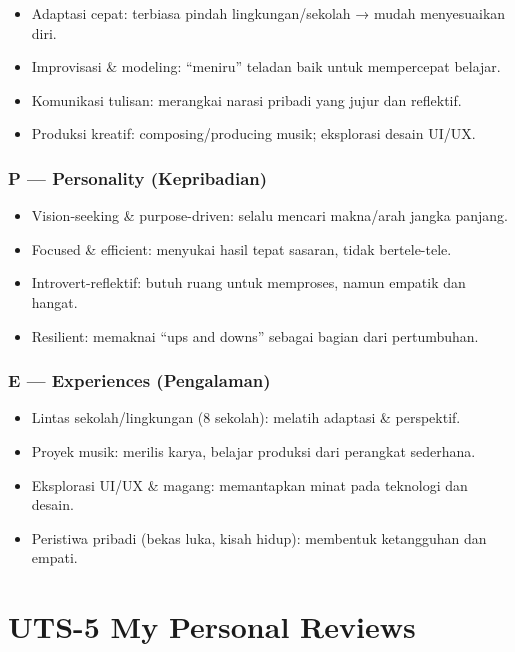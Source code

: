 \documentclass[
  letterpaper,
  DIV=11,
  numbers=noendperiod]{scrreprt}
\providecommand{\tightlist}{%
  \setlength{\itemsep}{0pt}\setlength{\parskip}{0pt}}
\begin{document}
\begin{itemize}
\tightlist
\item
  Adaptasi cepat: terbiasa pindah lingkungan/sekolah → mudah
  menyesuaikan diri.
\item
  Improvisasi \& modeling: ``meniru'' teladan baik untuk mempercepat
  belajar.
\item
  Komunikasi tulisan: merangkai narasi pribadi yang jujur dan reflektif.
\item
  Produksi kreatif: composing/producing musik; eksplorasi desain UI/UX.
\end{itemize}

\subsection{P --- Personality
(Kepribadian)}\label{p-personality-kepribadian}

\begin{itemize}
\tightlist
\item
  Vision-seeking \& purpose-driven: selalu mencari makna/arah jangka
  panjang.
\item
  Focused \& efficient: menyukai hasil tepat sasaran, tidak
  bertele-tele.
\item
  Introvert-reflektif: butuh ruang untuk memproses, namun empatik dan
  hangat.
\item
  Resilient: memaknai ``ups and downs'' sebagai bagian dari pertumbuhan.
\end{itemize}

\subsection{E --- Experiences
(Pengalaman)}\label{e-experiences-pengalaman}

\begin{itemize}
\tightlist
\item
  Lintas sekolah/lingkungan (8 sekolah): melatih adaptasi \& perspektif.
\item
  Proyek musik: merilis karya, belajar produksi dari perangkat
  sederhana.
\item
  Eksplorasi UI/UX \& magang: memantapkan minat pada teknologi dan
  desain.
\item
  Peristiwa pribadi (bekas luka, kisah hidup): membentuk ketangguhan dan
  empati.
\end{itemize}


\chapter{UTS-5 My Personal Reviews}\label{uts-5-my-personal-reviews}
\end{document}

